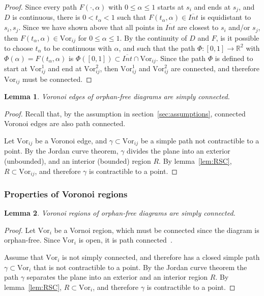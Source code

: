 \documentclass[11pt]{article}
\newtheorem{lemma}{Lemma}
\newcommand{\Vor}{\text{Vor}}
\begin{document}
\begin{proof}
Since every path $F(\cdot,\alpha)$ with $0\le\alpha\le 1$ starts at $s_i$ and ends at $s_j$, 
	and $D$ is continuous, there is $0< t_\alpha < 1$ such that $F(t_\alpha,\alpha)\in\overline{Int}$ is equidistant to $s_i,s_j$. 
Since we have shown above that all points in $\overline{Int}$ are closest to $s_i$ and/or $s_j$, 
	then $F(t_\alpha,\alpha)\in\Vor_{ij}$ for $0\le\alpha\le 1$. 
By the continuity of $D$ and $F$, is it possible to choose $t_\alpha$ to be continuous with $\alpha$, 
	and such that the path $\Phi:[0,1]\rightarrow\mathbb{R}^2$ 
	with $\Phi(\alpha)=F(t_\alpha,\alpha)$ is $\Phi([0,1])\subset\overline{Int}\cap\Vor_{ij}$. 
Since the path $\Phi$ is defined to start at $\Vor^1_{ij}$ and end at $\Vor^2_{ij}$, then 
	$\Vor^1_{ij}$ and $\Vor^2_{ij}$ are connected, 
	and therefore $\Vor_{ij}$ must be connected. 
\end{proof}


\begin{lemma}\label{lem:SCedges}
	Voronoi edges of orphan-free diagrams are simply connected. 
\end{lemma}

\begin{proof}

Recall that, by the assumption in section~\ref{sec:assumptions}, 
	connected Voronoi edges are also path connected.


Let $\Vor_{ij}$ be a Voronoi edge, and $\gamma\subset\Vor_{ij}$ be a simple path not contractible to a point. 
By the Jordan curve theorem, $\gamma$ divides the plane into an exterior (unbounded), 
	and an interior (bounded) region $R$. 
By lemma~\ref{lem:RSC}, $R\subset\Vor_{ij}$, and therefore $\gamma$ is contractible to a point. 

\end{proof}





\subsubsection{Properties of Voronoi regions}



\begin{lemma}\label{lem:regionSC}
Voronoi regions of orphan-free diagrams are simply connected.
\end{lemma}

\begin{proof}
Let $\Vor_i$ be a Vornoi region, which must be connected since the diagram is orphan-free. 
Since $\Vor_i$ is open, it is path connected~\cite[p.\ 158]{munkres2000topology}.



Assume that $\Vor_i$ is not simply connected, 
	and therefore has a closed simple path $\gamma\subset\Vor_i$ that is not contractible to a point. 
By the Jordan curve theorem the path $\gamma$ separates the plane into an exterior and an interior region $R$. 
By lemma~\ref{lem:RSC}, $R\subset\Vor_{i}$, and therefore $\gamma$ is contractible to a point. 
\end{proof}
\end{document}
